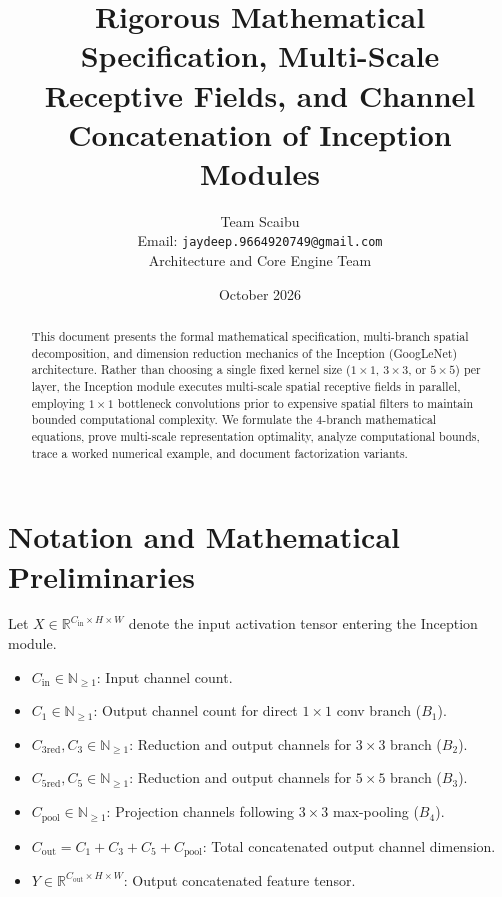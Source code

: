 \documentclass[11pt,a4paper]{article}
\title{\textbf{Rigorous Mathematical Specification, Multi-Scale Receptive Fields, and Channel Concatenation of Inception Modules}}
\author{Team Scaibu \\ \small Email: \texttt{jaydeep.9664920749@gmail.com} \\ \small Architecture and Core Engine Team}
\date{October 2026}
\theoremstyle{definition}
\begin{document}
\maketitle

\begin{abstract}
This document presents the formal mathematical specification, multi-branch spatial decomposition, and dimension reduction mechanics of the Inception (GoogLeNet) architecture. Rather than choosing a single fixed kernel size ($1 \times 1$, $3 \times 3$, or $5 \times 5$) per layer, the Inception module executes multi-scale spatial receptive fields in parallel, employing $1 \times 1$ bottleneck convolutions prior to expensive spatial filters to maintain bounded computational complexity. We formulate the 4-branch mathematical equations, prove multi-scale representation optimality, analyze computational bounds, trace a worked numerical example, and document factorization variants.
\end{abstract}

\section{Notation and Mathematical Preliminaries}

Let $X \in \mathbb{R}^{C_{\text{in}} \times H \times W}$ denote the input activation tensor entering the Inception module.

\begin{itemize}
    \item $C_{\text{in}} \in \mathbb{N}_{\ge 1}$: Input channel count.
    \item $C_1 \in \mathbb{N}_{\ge 1}$: Output channel count for direct $1 \times 1$ conv branch ($B_1$).
    \item $C_{3\text{red}}, C_3 \in \mathbb{N}_{\ge 1}$: Reduction and output channels for $3 \times 3$ branch ($B_2$).
    \item $C_{5\text{red}}, C_5 \in \mathbb{N}_{\ge 1}$: Reduction and output channels for $5 \times 5$ branch ($B_3$).
    \item $C_{\text{pool}} \in \mathbb{N}_{\ge 1}$: Projection channels following $3 \times 3$ max-pooling ($B_4$).
    \item $C_{\text{out}} = C_1 + C_3 + C_5 + C_{\text{pool}}$: Total concatenated output channel dimension.
    \item $Y \in \mathbb{R}^{C_{\text{out}} \times H \times W}$: Output concatenated feature tensor.
\end{itemize}
\end{document}
